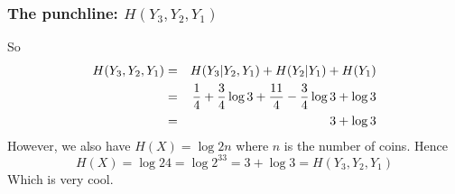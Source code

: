 \documentclass[12pt]{article}
\begin{document}
\subsubsection*{The punchline: $H(Y_3,Y_2,Y_1)$}

So
\begin{eqnarray}
H(Y_3,Y_2,Y_1)&=&H(Y_3|Y_2,Y_1)+H(Y_2|Y_1)+H(Y_1)\cr
              &=&\frac{1}{4}+\frac{3}{4}\log{3}+\frac{11}{4}-\frac{3}{4}\log{3}+\log{3}\cr
              &=&3+\log{3}
\end{eqnarray}
However, we also have $H(X)=\log{2n}$ where $n$ is the number of coins. Hence
\begin{equation}
H(X)=\log{24}=\log{2^33}=3+\log{3}=H(Y_3,Y_2,Y_1)
\end{equation}
Which is very cool.
\end{document}

